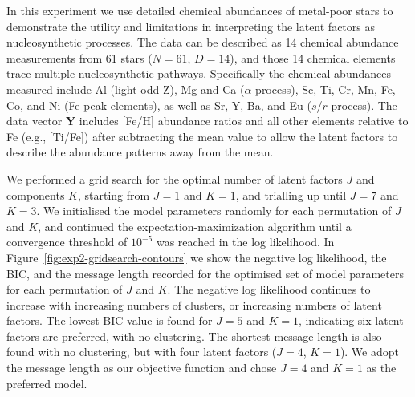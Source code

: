 \documentclass[twocolumn]{aastex62}
\newcommand{\data}{\textbf{Y}}
\newcommand{\NumData}{N}
\newcommand{\NumDimensions}{D}
\newcommand{\NumLatentFactors}{J}
\newcommand{\NumComponents}{K}
\begin{document}
In this experiment we use detailed chemical abundances of metal-poor stars 
\citep{Barklem:2005} to demonstrate the utility and limitations
in interpreting the latent factors as nucleosynthetic processes. The data 
can be described as 14 chemical abundance measurements from 61 stars ($\NumData = 61$, $\NumDimensions = 14$), and those 14 chemical elements trace multiple nucleosynthetic pathways. Specifically the chemical
abundances measured include Al (light odd-Z), Mg and Ca ($\alpha$-process), Sc, Ti, Cr, Mn, Fe, Co, and Ni (Fe-peak elements), as well as Sr, Y, Ba, and Eu ($s$/$r$-process). 
The data vector $\data$ includes [Fe/H] abundance ratios and all other elements
relative to Fe (e.g., [Ti/Fe]) after subtracting the mean value to allow the
latent factors to describe the abundance patterns away from the mean.

We performed a grid search for the optimal number of latent factors 
$\NumLatentFactors$ and components $\NumComponents$, starting from 
$\NumLatentFactors = 1$ and $K = 1$, and trialling up until 
$\NumLatentFactors = 7$ and $\NumComponents = 3$. 
We initialised
the model parameters randomly for each permutation of $J$ and $K$, and continued
the expectation-maximization algorithm
until a convergence threshold of $10^{-5}$ was reached in the log likelihood. 
In Figure~\ref{fig:exp2-gridsearch-contours} we show the negative log likelihood,
the BIC, and the message length recorded for the optimised set of model parameters 
for each permutation of $J$ and $K$. The negative log likelihood continues to
increase with increasing numbers of clusters, or increasing numbers of latent
factors.
The lowest BIC value is found for $J = 5$ and $K = 1$, indicating
six latent factors are preferred, with no clustering. The shortest message length
is also found with no clustering,  but with four latent factors ($J = 4$, $K = 1$).
We adopt the message length as our objective function and chose $J = 4$ and $K = 1$
as the preferred model.
\end{document}
